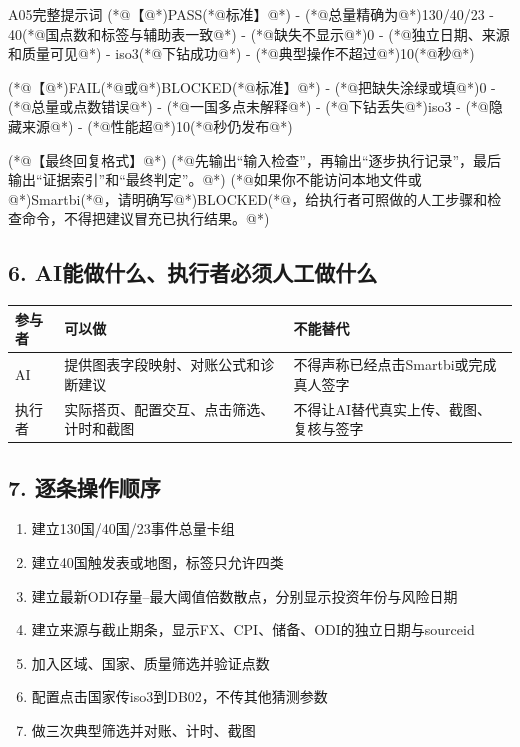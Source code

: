 \documentclass[UTF8,openany,zihao=-4]{ctexbook}
\renewcommand{\_}{\textunderscore\allowbreak}
\begin{document}
\begin{PromptBox}{A05完整提示词}
(*@{\promptcjk 【}@*)PASS(*@{\promptcjk 标准】}@*)
- (*@{\promptcjk 总量精确为}@*)130/40/23
- 40(*@{\promptcjk 国点数和标签与辅助表一致}@*)
- (*@{\promptcjk 缺失不显示}@*)0
- (*@{\promptcjk 独立日期、来源和质量可见}@*)
- iso3(*@{\promptcjk 下钻成功}@*)
- (*@{\promptcjk 典型操作不超过}@*)10(*@{\promptcjk 秒}@*)

(*@{\promptcjk 【}@*)FAIL(*@{\promptcjk 或}@*)BLOCKED(*@{\promptcjk 标准】}@*)
- (*@{\promptcjk 把缺失涂绿或填}@*)0
- (*@{\promptcjk 总量或点数错误}@*)
- (*@{\promptcjk 一国多点未解释}@*)
- (*@{\promptcjk 下钻丢失}@*)iso3
- (*@{\promptcjk 隐藏来源}@*)
- (*@{\promptcjk 性能超}@*)10(*@{\promptcjk 秒仍发布}@*)

(*@{\promptcjk 【最终回复格式】}@*)
(*@{\promptcjk 先输出“输入检查”，再输出“逐步执行记录”，最后输出“证据索引”和“最终判定”。}@*)
(*@{\promptcjk 如果你不能访问本地文件或}@*)Smartbi(*@{\promptcjk ，请明确写}@*)BLOCKED(*@{\promptcjk ，给执行者可照做的人工步骤和检查命令，不得把建议冒充已执行结果。}@*)
\end{PromptBox}

\subsection*{6. AI能做什么、执行者必须人工做什么}
\noindent\begin{tabularx}{\textwidth}{@{}p{}XX@{}}
\toprule
\textbf{参与者} & \textbf{可以做} & \textbf{不能替代} \\
\midrule
AI & 提供图表字段映射、对账公式和诊断建议 & 不得声称已经点击Smartbi或完成真人签字 \\
执行者 & 实际搭页、配置交互、点击筛选、计时和截图 & 不得让AI替代真实上传、截图、复核与签字 \\
\bottomrule
\end{tabularx}

\subsection*{7. 逐条操作顺序}
\begin{enumerate}
\item 建立130国/40国/23事件总量卡组
\item 建立40国触发表或地图，标签只允许四类
\item 建立最新ODI存量--最大阈值倍数散点，分别显示投资年份与风险日期
\item 建立来源与截止期条，显示FX、CPI、储备、ODI的独立日期与source\_id
\item 加入区域、国家、质量筛选并验证点数
\item 配置点击国家传iso3到DB02，不传其他猜测参数
\item 做三次典型筛选并对账、计时、截图
\end{enumerate}
\end{document}
